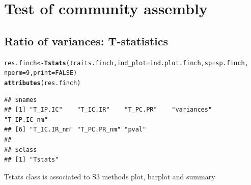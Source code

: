 \documentclass[12pt]{article}\usepackage[]{graphicx}\usepackage[]{color}
\makeatletter
\newcommand{\hlnum}[1]{\textcolor[rgb]{0.686,0.059,0.569}{#1}}%
\newcommand{\hlstd}[1]{\textcolor[rgb]{0.345,0.345,0.345}{#1}}%
\newcommand{\hlkwb}[1]{\textcolor[rgb]{0.69,0.353,0.396}{#1}}%
\newcommand{\hlkwc}[1]{\textcolor[rgb]{0.333,0.667,0.333}{#1}}%
\newcommand{\hlkwd}[1]{\textcolor[rgb]{0.737,0.353,0.396}{\textbf{#1}}}%
\newenvironment{kframe}{%
 \def\at@end@of@kframe{}%
 \ifinner\ifhmode%
  \def\at@end@of@kframe{\end{minipage}}%
  \begin{minipage}{\columnwidth}%
 \fi\fi%
 \def\FrameCommand##1{\hskip\@totalleftmargin \hskip-\fboxsep
 \colorbox{shadecolor}{##1}\hskip-\fboxsep
     \hskip-\linewidth \hskip-\@totalleftmargin \hskip\columnwidth}%
 \MakeFramed {\advance\hsize-\width
   \@totalleftmargin\z@ \linewidth\hsize
   \@setminipage}}%
 {\par\unskip\endMakeFramed%
 \at@end@of@kframe}
\newenvironment{knitrout}{}{} %
\makeatother
\begin{document}
\newpage

\section{Test of community assembly}

\subsection{Ratio of variances: T-statistics}

\begin{knitrout}
\color{fgcolor}\begin{kframe}
\begin{alltt}
\hlstd{res.finch} \hlkwb{<-} \hlkwd{Tstats}\hlstd{(traits.finch,} \hlkwc{ind_plot} \hlstd{= ind.plot.finch,} \hlkwc{sp} \hlstd{= sp.finch,}
    \hlkwc{nperm} \hlstd{=} \hlnum{9}\hlstd{,} \hlkwc{print} \hlstd{=} \hlnum{FALSE}\hlstd{)}
\hlkwd{attributes}\hlstd{(res.finch)}
\end{alltt}
\begin{verbatim}
## $names
## [1] "T_IP.IC"    "T_IC.IR"    "T_PC.PR"    "variances"  "T_IP.IC_nm"
## [6] "T_IC.IR_nm" "T_PC.PR_nm" "pval"      
## 
## $class
## [1] "Tstats"
\end{verbatim}
\end{kframe}
\end{knitrout}


Tstats class is associated to S3 methods plot, barplot and summary
\end{document}
